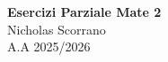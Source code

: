 \documentclass[12pt, a4paper]{report}
\begin{document}
\vspace*{\fill}
\begin{center}
    {\Huge \textbf{Esercizi Parziale Mate 2}} \\[0.5cm]
    {\Large Nicholas Scorrano} \\[0.3cm]
    {\large A.A 2025/2026}
\end{center}
\vspace*{\fill}

\tableofcontents
\newpage




\end{document}
